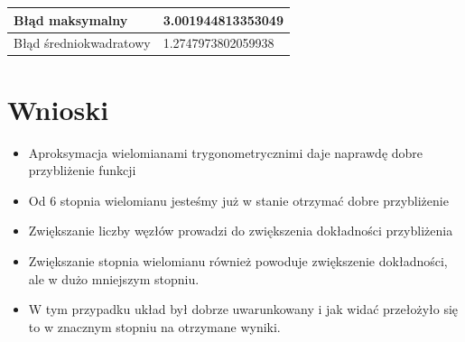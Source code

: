 \documentclass{article}
\begin{document}
\begin{table}[!ht]
    \centering
    \begin{tabular}{|l|l|}
    \hline
        Błąd maksymalny & 3.001944813353049   \\ \hline
        Błąd średniokwadratowy & 1.2747973802059938 \\ \hline
        
    \end{tabular}
\end{table}

\section{Wnioski}

\begin{itemize}
    \item Aproksymacja wielomianami trygonometrycznimi daje naprawdę dobre przybliżenie funkcji
    \item Od 6 stopnia wielomianu jesteśmy już w stanie otrzymać dobre przybliżenie
    \item Zwiększanie liczby węzłów prowadzi do zwiększenia dokładności przybliżenia
    \item Zwiększanie stopnia wielomianu również powoduje zwiększenie dokładności, ale w dużo mniejszym stopniu.
    \item W tym przypadku układ był dobrze uwarunkowany i jak widać przełożyło się to w znacznym stopniu na otrzymane wyniki.
\end{itemize}
\end{document}
